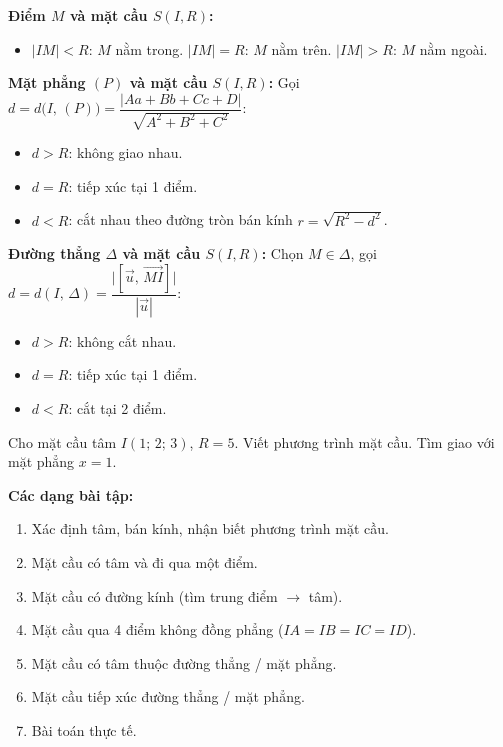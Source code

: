 \documentclass[12pt,a4paper]{article}
\begin{document}
\begin{congthuc}[title={Vị trí tương đối}]
  \textbf{Điểm $M$ và mặt cầu $S(I, R)$:}
  \begin{itemize}
    \item $|IM| < R$: $M$ nằm trong. \quad
      $|IM| = R$: $M$ nằm trên. \quad
      $|IM| > R$: $M$ nằm ngoài.
  \end{itemize}

  \textbf{Mặt phẳng $(P)$ và mặt cầu $S(I, R)$:}
  Gọi $d = d\bigl(I,\, (P)\bigr) = \dfrac{|Aa + Bb + Cc + D|}{\sqrt{A^2 + B^2 + C^2}}$:
  \begin{itemize}
    \item $d > R$: không giao nhau.
    \item $d = R$: tiếp xúc tại 1 điểm.
    \item $d < R$: cắt nhau theo đường tròn bán kính $r = \sqrt{R^2 - d^2}$.
  \end{itemize}

  \textbf{Đường thẳng $\Delta$ và mặt cầu $S(I, R)$:}
  Chọn $M \in \Delta$, gọi $d = d(I,\, \Delta) = \dfrac{\bigl|[\vec{u},\, \overrightarrow{MI}]\bigr|}{|\vec{u}|}$:
  \begin{itemize}
    \item $d > R$: không cắt nhau.
    \item $d = R$: tiếp xúc tại 1 điểm.
    \item $d < R$: cắt tại 2 điểm.
  \end{itemize}
\end{congthuc}

\begin{vidu}
  Cho mặt cầu tâm $I(1;\, 2;\, 3)$, $R = 5$. Viết phương trình mặt cầu. Tìm giao với mặt phẳng $x = 1$.
\end{vidu}

\medskip\noindent\textbf{Các dạng bài tập:}
\begin{enumerate}[label=\textbf{Dạng \arabic*:}, leftmargin=*, align=left]
  \item Xác định tâm, bán kính, nhận biết phương trình mặt cầu.
  \item Mặt cầu có tâm và đi qua một điểm.
  \item Mặt cầu có đường kính (tìm trung điểm $\to$ tâm).
  \item Mặt cầu qua 4 điểm không đồng phẳng ($IA = IB = IC = ID$).
  \item Mặt cầu có tâm thuộc đường thẳng / mặt phẳng.
  \item Mặt cầu tiếp xúc đường thẳng / mặt phẳng.
  \item Bài toán thực tế.
\end{enumerate}
\end{document}
